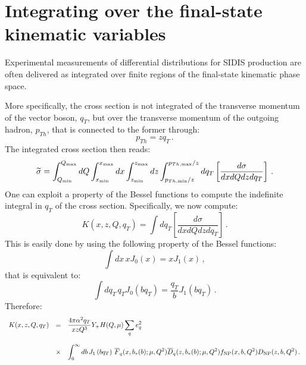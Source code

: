 \documentclass[10pt,a4paper]{article}
\begin{document}
\section{Integrating over the final-state kinematic variables}

Experimental measurements of differential distributions for SIDIS
production are often delivered as integrated over finite regions of
the final-state kinematic phase space. 

More specifically, the cross section is not integrated of the
transverse momentum of the vector boson, $q_T$, but over the
transverse momentum of the outgoing hadron, $p_{Th}$, that is
connected to the former through:
\begin{equation}
p_{Th} = zq_T\,.
\end{equation}
The integrated cross section then reads:
\begin{equation}
  \widetilde{\sigma}=\int_{Q_{\rm min}}^{Q_{\rm max}}dQ \int_{x_{\rm min}}^{x_{\rm max}}dx
  \int_{z_{\rm
      min}}^{z_{\rm max}}dz \int_{p_{Th,\rm min}/z}^{p_{Th,\rm max}/z}dq_{T}\left[\frac{d\sigma}{dxdQ
      dz dq_{T}} \right]\,.
\label{eq:IntcrosssectionSIDIS}
\end{equation}
One can exploit a property of the Bessel functions to compute the
indefinite integral in $q_{T}$ of the cross section. Specifically, we
now compute:
\begin{equation}
  K(x,z,Q,q_{T}) = \int dq_{T}\left[\frac{d\sigma}{dxdQdz dq_{T}}\right]\,.
\end{equation}
This is easily done by using the following property of the Bessel
functions:
\begin{equation}
\int dx\,x J_0(x) = xJ_1(x)\,,
\end{equation}
that is equivalent to:
\begin{equation}
  \int dq_{T}\,q_{T} J_0\left(bq_T\right) = \frac{q_T}{b}J_1\left(bq_T\right)\,.
\end{equation}
Therefore:
\begin{equation}
\begin{array}{rcl}
\displaystyle   K(x,z,Q,q_{T}) &=&\displaystyle
\frac{4\pi \alpha^2q_{T}}{xzQ^3}Y_+ H(Q,\mu) \sum_q e_q^2\\
\\
&\times&\displaystyle 
  \int_0^\infty db\, J_1\left(bq_T\right)
         \,\overline{F}_q(x,b_*(b);\mu,Q^2)
         \overline{D}_q(z,b_*(b);\mu,Q^2) f_{\rm NP}(x,b,Q^2) D_{\rm NP}(z,b,Q^2)\,.
\end{array}
\end{equation}
\end{document}
